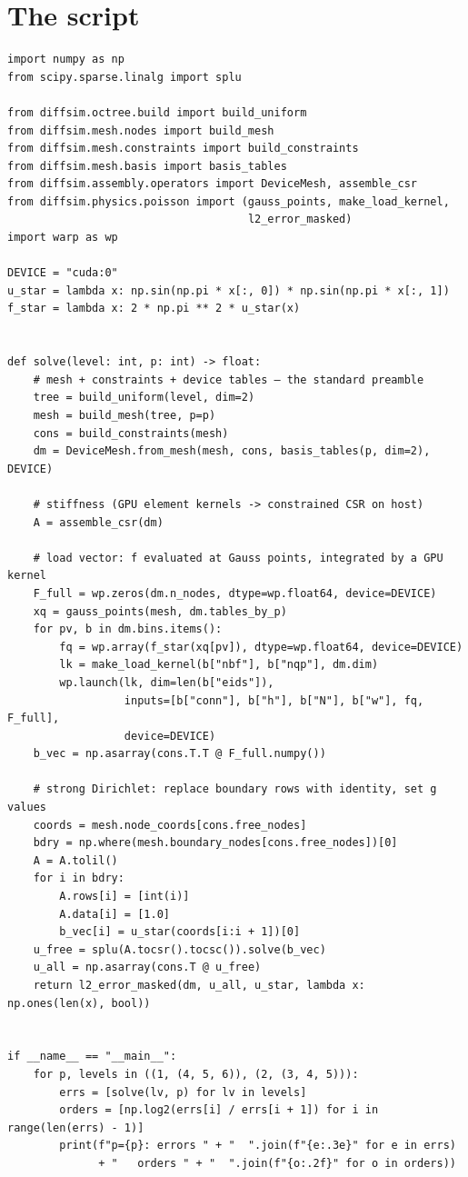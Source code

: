 \section*{The script}
\begin{lstlisting}
import numpy as np
from scipy.sparse.linalg import splu

from diffsim.octree.build import build_uniform
from diffsim.mesh.nodes import build_mesh
from diffsim.mesh.constraints import build_constraints
from diffsim.mesh.basis import basis_tables
from diffsim.assembly.operators import DeviceMesh, assemble_csr
from diffsim.physics.poisson import (gauss_points, make_load_kernel,
                                     l2_error_masked)
import warp as wp

DEVICE = "cuda:0"
u_star = lambda x: np.sin(np.pi * x[:, 0]) * np.sin(np.pi * x[:, 1])
f_star = lambda x: 2 * np.pi ** 2 * u_star(x)


def solve(level: int, p: int) -> float:
    # mesh + constraints + device tables — the standard preamble
    tree = build_uniform(level, dim=2)
    mesh = build_mesh(tree, p=p)
    cons = build_constraints(mesh)
    dm = DeviceMesh.from_mesh(mesh, cons, basis_tables(p, dim=2), DEVICE)

    # stiffness (GPU element kernels -> constrained CSR on host)
    A = assemble_csr(dm)

    # load vector: f evaluated at Gauss points, integrated by a GPU kernel
    F_full = wp.zeros(dm.n_nodes, dtype=wp.float64, device=DEVICE)
    xq = gauss_points(mesh, dm.tables_by_p)
    for pv, b in dm.bins.items():
        fq = wp.array(f_star(xq[pv]), dtype=wp.float64, device=DEVICE)
        lk = make_load_kernel(b["nbf"], b["nqp"], dm.dim)
        wp.launch(lk, dim=len(b["eids"]),
                  inputs=[b["conn"], b["h"], b["N"], b["w"], fq, F_full],
                  device=DEVICE)
    b_vec = np.asarray(cons.T.T @ F_full.numpy())

    # strong Dirichlet: replace boundary rows with identity, set g values
    coords = mesh.node_coords[cons.free_nodes]
    bdry = np.where(mesh.boundary_nodes[cons.free_nodes])[0]
    A = A.tolil()
    for i in bdry:
        A.rows[i] = [int(i)]
        A.data[i] = [1.0]
        b_vec[i] = u_star(coords[i:i + 1])[0]
    u_free = splu(A.tocsr().tocsc()).solve(b_vec)
    u_all = np.asarray(cons.T @ u_free)
    return l2_error_masked(dm, u_all, u_star, lambda x: np.ones(len(x), bool))


if __name__ == "__main__":
    for p, levels in ((1, (4, 5, 6)), (2, (3, 4, 5))):
        errs = [solve(lv, p) for lv in levels]
        orders = [np.log2(errs[i] / errs[i + 1]) for i in range(len(errs) - 1)]
        print(f"p={p}: errors " + "  ".join(f"{e:.3e}" for e in errs)
              + "   orders " + "  ".join(f"{o:.2f}" for o in orders))
\end{lstlisting}

